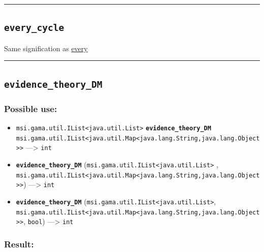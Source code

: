 \documentclass[]{book}
\providecommand{\tightlist}{%
  \setlength{\itemsep}{0pt}\setlength{\parskip}{0pt}}
\theoremstyle{definition}
\theoremstyle{definition}
\theoremstyle{definition}
\theoremstyle{remark}
\begin{document}
\begin{center}\rule{0.5\linewidth}{\linethickness}\end{center}

\subsection{\texorpdfstring{\texttt{every\_cycle}}{every\_cycle}}\label{every_cycle}

Same signification as \href{operators-d-to-h.html\#every}{every}

\begin{center}\rule{0.5\linewidth}{\linethickness}\end{center}

\subsection{\texorpdfstring{\texttt{evidence\_theory\_DM}}{evidence\_theory\_DM}}\label{evidence_theory_dm}

\subsubsection{Possible use:}\label{possible-use-159}

\begin{itemize}
\tightlist
\item
  \texttt{msi.gama.util.IList\textless{}java.util.List\textgreater{}}
  \textbf{\texttt{evidence\_theory\_DM}}
  \texttt{msi.gama.util.IList\textless{}java.util.Map\textless{}java.lang.String,java.lang.Object\textgreater{}\textgreater{}}
  ---\textgreater{} \texttt{int}
\item
  \textbf{\texttt{evidence\_theory\_DM}}
  (\texttt{msi.gama.util.IList\textless{}java.util.List\textgreater{}} ,
  \texttt{msi.gama.util.IList\textless{}java.util.Map\textless{}java.lang.String,java.lang.Object\textgreater{}\textgreater{}})
  ---\textgreater{} \texttt{int}
\item
  \textbf{\texttt{evidence\_theory\_DM}}
  (\texttt{msi.gama.util.IList\textless{}java.util.List\textgreater{}},
  \texttt{msi.gama.util.IList\textless{}java.util.Map\textless{}java.lang.String,java.lang.Object\textgreater{}\textgreater{}},
  \texttt{bool}) ---\textgreater{} \texttt{int}
\end{itemize}

\subsubsection{Result:}\label{result-153}
\end{document}
